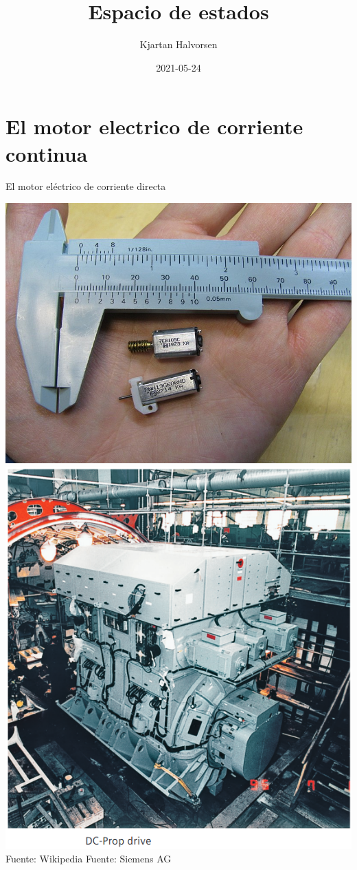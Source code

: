 \documentclass[presentation,aspectratio=169]{beamer}
\author{Kjartan Halvorsen}
\date{2021-05-24}
\title{Espacio de estados}
\begin{document}
\maketitle

\section{El motor electrico de corriente continua}
\label{sec:org845ac0d}
\begin{frame}[label={sec:org54bf13d}]{El motor eléctrico de corriente directa}
\begin{center}
\includegraphics[height=0.6\textheight]{../../figures/wiki-small-dc-motor.jpg}
\includegraphics[width=0.6\textheight]{../../figures/Siemens-DC-prop.png}\\
{\footnotesize Fuente: Wikipedia \hspace*{3cm} Fuente: Siemens AG}
\end{center}
\end{frame}
\end{document}
